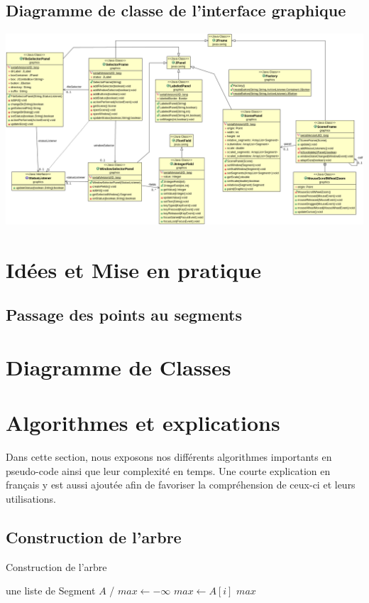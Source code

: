 \documentclass[10pt,a4paper]{article}
\begin{document}
\subsection{Diagramme de classe de l'interface graphique}
\includegraphics[scale=0.25]{../src/UML/graphics.png}

\section{Idées et Mise en pratique}
\subsection{Passage des points au segments}

\section{Diagramme de Classes}

\section{Algorithmes et explications}
Dans cette section, nous exposons nos différents algorithmes importants en pseudo-code ainsi que leur complexité en temps. Une courte explication en français y est aussi ajoutée afin de favoriser la compréhension de ceux-ci et leurs utilisations.
\subsection{Construction de l'arbre}

\begin{algorithm}
\caption{Construction de l'arbre}
\begin{algorithmic}[1]
\REQUIRE une liste de Segment $A$
\ENSURE /
\STATE $max \leftarrow -\infty$
\STATE $max \leftarrow A[i]$
\ENDIF
\ENDFOR
\RETURN $max$
\end{algorithmic}
\end{algorithm}
\end{document}
